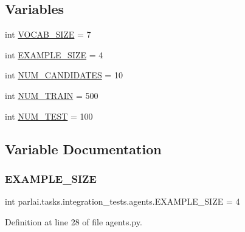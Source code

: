 \subsection*{Variables}
\begin{DoxyCompactItemize}
\item 
int \hyperlink{namespaceparlai_1_1tasks_1_1integration__tests_1_1agents_acce0481273f02014fb577733cfa8f2b7}{V\+O\+C\+A\+B\+\_\+\+S\+I\+ZE} = 7
\item 
int \hyperlink{namespaceparlai_1_1tasks_1_1integration__tests_1_1agents_a1a9a556c90b625c74c9afd0a1a82ca3c}{E\+X\+A\+M\+P\+L\+E\+\_\+\+S\+I\+ZE} = 4
\item 
int \hyperlink{namespaceparlai_1_1tasks_1_1integration__tests_1_1agents_a43719015a313515dcd768b12491ec3a1}{N\+U\+M\+\_\+\+C\+A\+N\+D\+I\+D\+A\+T\+ES} = 10
\item 
int \hyperlink{namespaceparlai_1_1tasks_1_1integration__tests_1_1agents_abc5a5ed634c3ec4aa371a49b883d37a1}{N\+U\+M\+\_\+\+T\+R\+A\+IN} = 500
\item 
int \hyperlink{namespaceparlai_1_1tasks_1_1integration__tests_1_1agents_ad6197fa4ad385bde5542da3aa644ad8b}{N\+U\+M\+\_\+\+T\+E\+ST} = 100
\end{DoxyCompactItemize}


\subsection{Variable Documentation}
\mbox{\label{namespaceparlai_1_1tasks_1_1integration__tests_1_1agents_a1a9a556c90b625c74c9afd0a1a82ca3c}} 
\subsubsection{\texorpdfstring{E\+X\+A\+M\+P\+L\+E\+\_\+\+S\+I\+ZE}{EXAMPLE\_SIZE}}
{\footnotesize\ttfamily int parlai.\+tasks.\+integration\+\_\+tests.\+agents.\+E\+X\+A\+M\+P\+L\+E\+\_\+\+S\+I\+ZE = 4}



Definition at line 28 of file agents.\+py.


